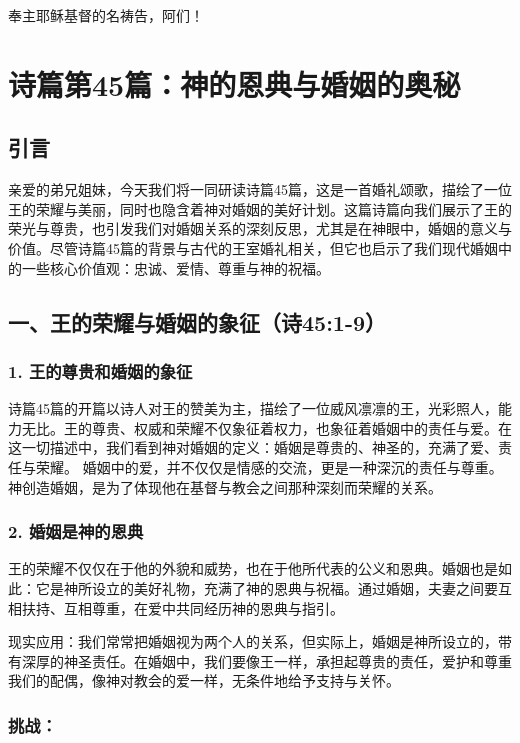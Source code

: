 \documentclass[a4paper, 12pt]{article}
\begin{document}
奉主耶稣基督的名祷告，阿们！
\newpage
\section{诗篇第45篇：神的恩典与婚姻的奥秘}
\subsection*{引言}
\hspace{0.6cm}亲爱的弟兄姐妹，今天我们将一同研读诗篇45篇，这是一首婚礼颂歌，描绘了一位王的荣耀与美丽，同时也隐含着神对婚姻的美好计划。这篇诗篇向我们展示了王的荣光与尊贵，也引发我们对婚姻关系的深刻反思，尤其是在神眼中，婚姻的意义与价值。尽管诗篇45篇的背景与古代的王室婚礼相关，但它也启示了我们现代婚姻中的一些核心价值观：忠诚、爱情、尊重与神的祝福。

\subsection*{一、王的荣耀与婚姻的象征（诗45:1-9）}

\subsubsection*{1. 王的尊贵和婚姻的象征}
\hspace{0.6cm}诗篇45篇的开篇以诗人对王的赞美为主，描绘了一位威风凛凛的王，光彩照人，能力无比。王的尊贵、权威和荣耀不仅象征着权力，也象征着婚姻中的责任与爱。在这一切描述中，我们看到神对婚姻的定义：婚姻是尊贵的、神圣的，充满了爱、责任与荣耀。
婚姻中的爱，并不仅仅是情感的交流，更是一种深沉的责任与尊重。神创造婚姻，是为了体现他在基督与教会之间那种深刻而荣耀的关系。
\subsubsection*{2. 婚姻是神的恩典}
\hspace{0.6cm}王的荣耀不仅仅在于他的外貌和威势，也在于他所代表的公义和恩典。婚姻也是如此：它是神所设立的美好礼物，充满了神的恩典与祝福。通过婚姻，夫妻之间要互相扶持、互相尊重，在爱中共同经历神的恩典与指引。

现实应用：我们常常把婚姻视为两个人的关系，但实际上，婚姻是神所设立的，带有深厚的神圣责任。在婚姻中，我们要像王一样，承担起尊贵的责任，爱护和尊重我们的配偶，像神对教会的爱一样，无条件地给予支持与关怀。
\subsubsection*{挑战：}
\end{document}
